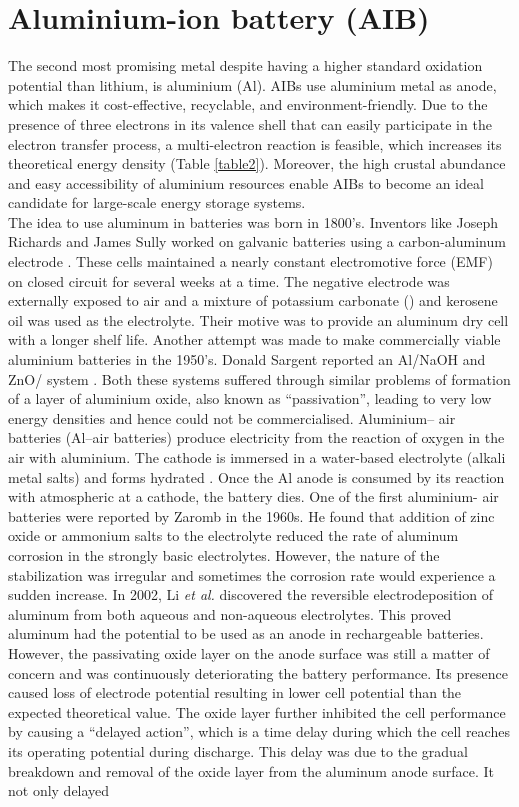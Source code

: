 \section{Aluminium-ion battery (AIB)}
The second most promising metal despite having a higher standard oxidation potential than lithium, is aluminium (Al). AIBs use aluminium metal as anode, which makes it cost-effective, recyclable, and environment-friendly. Due to the presence of three electrons in its valence shell that can easily participate in the electron transfer process, a multi-electron reaction is feasible, which increases its theoretical energy density (Table \ref{table2}). Moreover, the high crustal abundance and easy accessibility of aluminium resources enable AIBs to become an ideal candidate for large-scale energy storage systems. \\
The idea to use aluminum in batteries was born in 1800's. Inventors like Joseph Richards and James Sully worked on galvanic batteries using a carbon-aluminum electrode \cite{noauthor_james_1897}. These cells maintained a nearly constant electromotive force (EMF) on closed circuit for several weeks at a time. The negative electrode was externally exposed to air and a mixture of potassium carbonate () and kerosene oil was used as the electrolyte. Their motive was to provide an aluminum dry cell with a longer shelf life. Another attempt was made to make commercially viable aluminium batteries in the 1950's. Donald Sargent reported an Al/NaOH and ZnO/ system . Both these systems suffered through similar problems of formation of a layer of aluminium oxide, also known as \enquote{passivation}, leading to very low energy densities and hence could not be commercialised. Aluminium– air batteries (Al–air batteries) produce electricity from the reaction of oxygen in the air with aluminium. The cathode is immersed in a water-based electrolyte (alkali metal salts) and forms hydrated . Once the Al anode is consumed by its reaction with atmospheric  at a cathode, the battery dies. One of the first aluminium- air batteries were reported by Zaromb\cite{zaromb_use_1962} in the 1960s. He found that addition of zinc oxide or ammonium salts to the electrolyte reduced the rate of aluminum corrosion in the strongly basic electrolytes. However, the nature of the stabilization was irregular and sometimes the corrosion rate would experience a sudden increase\cite{bockstie_control_1963}. In 2002, Li \textit{et al.} discovered the reversible electrodeposition of aluminum from both aqueous and non-aqueous electrolytes\cite{li_aluminum_2002}. This proved aluminum had the potential to be used as an anode in rechargeable batteries. However, the passivating oxide layer on the anode surface was still a matter of concern and was continuously deteriorating the battery performance. Its presence caused loss of electrode potential resulting in lower cell potential than the expected theoretical value. The oxide layer further inhibited the cell performance by causing a \enquote{delayed action}, which is a time delay during which the cell reaches its operating potential during discharge. This delay was due to the gradual breakdown and removal of the oxide layer from the aluminum anode surface. It not only delayed 